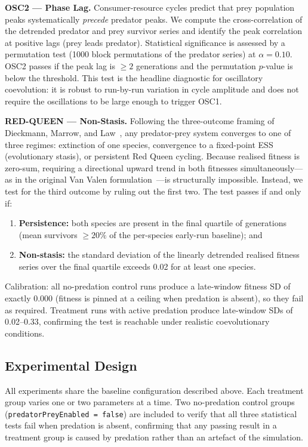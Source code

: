\documentclass[11pt]{article}
\begin{document}
\textbf{OSC2 — Phase Lag.}
Consumer-resource cycles predict that prey population peaks systematically \emph{precede}
predator peaks.
We compute the cross-correlation of the detrended predator and prey survivor series and
identify the peak correlation at positive lags (prey leads predator).
Statistical significance is assessed by a permutation test (1000 block permutations of the
predator series) at $\alpha = 0.10$.
OSC2 passes if the peak lag is $\geq 2$ generations and the permutation $p$-value is below the
threshold.
This test is the headline diagnostic for oscillatory coevolution: it is robust to run-by-run
variation in cycle amplitude and does not require the oscillations to be large enough to
trigger OSC1.

\textbf{RED-QUEEN — Non-Stasis.}
Following the three-outcome framing of Dieckmann, Marrow, and Law~\cite{dieckmann1995},
any predator-prey system converges to one of three regimes: extinction of one species,
convergence to a fixed-point ESS (evolutionary stasis), or persistent Red Queen cycling.
Because realised fitness is zero-sum, requiring a directional upward trend in both fitnesses
simultaneously—as in the original Van Valen formulation~\cite{valen1973}—is
structurally impossible.
Instead, we test for the third outcome by ruling out the first two.
The test passes if and only if:
\begin{enumerate}
  \item \textbf{Persistence:} both species are present in the final quartile of generations
        (mean survivors $\geq 20\%$ of the per-species early-run baseline); and
  \item \textbf{Non-stasis:} the standard deviation of the linearly detrended realised fitness
        series over the final quartile exceeds 0.02 for at least one species.
\end{enumerate}
Calibration: all no-predation control runs produce a late-window fitness SD of exactly 0.000
(fitness is pinned at a ceiling when predation is absent), so they fail as required.
Treatment runs with active predation produce late-window SDs of 0.02--0.33, confirming the
test is reachable under realistic coevolutionary conditions.

\subsection{Experimental Design}

All experiments share the baseline configuration described above.
Each treatment group varies one or two parameters at a time.
Two no-predation control groups (\texttt{predatorPreyEnabled = false}) are included to verify
that all three statistical tests fail when predation is absent, confirming that any passing
result in a treatment group is caused by predation rather than an artefact of the simulation.
\end{document}

